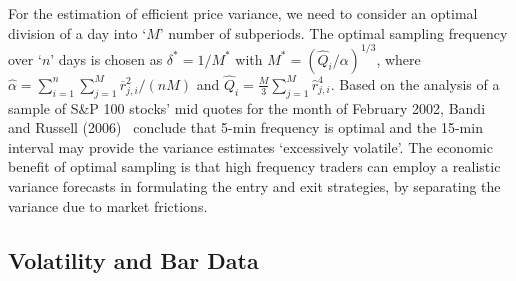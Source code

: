 For the estimation of efficient price variance, we need to consider an  optimal division of a day into `$M$' number of subperiods. The optimal sampling frequency over `$n$' days is chosen as $\delta^* = 1/M^*$ with $M^*= (\hat{Q}_i/\alpha)^{1/3}$, where $\hat{\alpha} = \sum_{i=1}^n \sum_{j=1}^M \overline{r}_{j,i}^2 / (nM)$ and $\hat{Q}_i = \frac{M}{3} \sum_{j=1}^M \hat{r}_{j,i}^4$. Based on the analysis of a sample of S\&P 100 stocks' mid quotes for the month of February 2002, Bandi and Russell (2006)~\cite{bandi} conclude that 5-min frequency is optimal and the 15-min interval may provide the variance estimates `excessively volatile'. The economic benefit of optimal sampling is that high frequency traders can employ a realistic variance forecasts in formulating the entry and exit strategies, by separating the variance due to market frictions. 



%

\subsection{Volatility and Bar Data}

